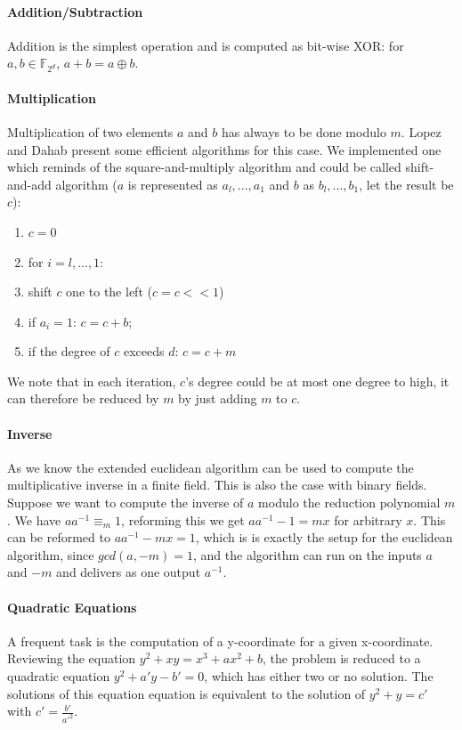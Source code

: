 \documentclass[11pt,english]{article}
\begin{document}
\paragraph{Addition/Subtraction}
Addition is the simplest operation and is computed as bit-wise XOR: for $a,b\in \mathbb{F}_{2^d}$, $a+b=a\oplus b$.
\paragraph{Multiplication}
Multiplication of two elements $a$ and $b$ has always to be done modulo $m$. Lopez and Dahab \cite{715867} present some efficient algorithms for this case. We implemented one which reminds of the square-and-multiply algorithm and could be called shift-and-add algorithm ($a$ is represented as $a_l,...,a_1$ and $b$ as $b_l,...,b_1$, let the result be $c$):
\begin{enumerate}
 \item $c=0$
 \item for $i=l,...,1$:
 \item shift $c$ one to the left ($c=c<<1$)
 \item if $a_i=1$: $c=c+b$;
 \item if the degree of $c$ exceeds $d$: $c=c+m$
\end{enumerate}
We note that in each iteration, $c$'s degree could be at most one degree to high, it can therefore be reduced by $m$ by just adding $m$ to $c$.

\paragraph{Inverse}
As we know the extended euclidean algorithm can be used to compute the multiplicative inverse in a finite field. This is also the case with binary fields. Suppose we want to compute the inverse of $a$ modulo the reduction polynomial $m$. We have $aa^{-1}\equiv_m 1$, reforming this we get $aa^{-1}-1=mx$ for arbitrary $x$. This can be reformed to $aa^{-1}-mx=1$, which is is exactly the setup for the euclidean algorithm, since $gcd(a,-m)=1$, and the algorithm can run on the inputs $a$ and $-m$ and delivers as one output $a^{-1}$.

\paragraph{Quadratic Equations}
\label{binquadeq}
A frequent task is the computation of a y-coordinate for a given x-coordinate. Reviewing the equation $y^2+xy=x^3+ax^2+b$, the problem is reduced to a quadratic equation $y^2+a'y-b'=0$, which has either two or no solution. The solutions of this equation equation is equivalent to the solution of $y^2+y=c'$ with $c'=\frac{b'}{a'^2}$.
\end{document}
